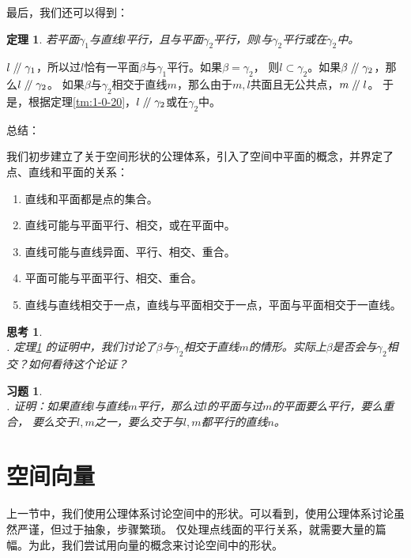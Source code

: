 \documentclass[12pt,UTF8]{ctexbook}
\newtheorem{tm}{定理}[section]
\newtheorem{sk}{思考}[section]
\renewcommand\parallel{\mathrel{/\mskip-4mu/}}
\newtheorem{xt}{习题}[section]
\begin{document}
最后，我们还可以得到：
\begin{tm}\label{tm:1-0-100}
    若平面$\gamma_1$与直线$l$平行，且与平面$\gamma_2$平行，则$l$与$\gamma_2$平行或在$\gamma_2$中。
\end{tm}
\begin{proof2}
    $l\parallel \gamma_1$，所以过$l$恰有一平面$\beta$与$\gamma_1$平行。如果$\beta=\gamma_2$，
    则$l\subset\gamma_2$。如果$\beta\parallel\gamma_2$，那么$l\parallel \gamma_2$。
    如果$\beta$与$\gamma_2$相交于直线$m$，那么由于$m,l$共面且无公共点，$m\parallel l$。
    于是，根据定理\ref{tm:1-0-20}，$l\parallel \gamma_2$或在$\gamma_2$中。
\end{proof2}

总结：

我们初步建立了关于空间形状的公理体系，引入了空间中平面的概念，并界定了点、直线和平面的关系：
\begin{enumerate}
    \item 直线和平面都是点的集合。
    \item 直线可能与平面平行、相交，或在平面中。
    \item 直线可能与直线异面、平行、相交、重合。
    \item 平面可能与平面平行、相交、重合。
    \item 直线与直线相交于一点，直线与平面相交于一点，平面与平面相交于一直线。
\end{enumerate}


\begin{sk}
    \mbox{} \\
    . 定理\ref{tm:1-0-100} 的证明中，我们讨论了$\beta$与$\gamma_2$相交于直线$m$的情形。实际上$\beta$是否会与$\gamma_2$相交？如何看待这个论证？
\end{sk}

\begin{xt}
    \mbox{} \\
    . 证明：如果直线$l$与直线$m$平行，那么过$l$的平面与过$m$的平面要么平行，要么重合，
    要么交于$l,m$之一，要么交于与$l,m$都平行的直线$n$。 
\end{xt}


\section{空间向量}

上一节中，我们使用公理体系讨论空间中的形状。可以看到，使用公理体系讨论虽然严谨，但过于抽象，步骤繁琐。
仅处理点线面的平行关系，就需要大量的篇幅。为此，我们尝试用向量的概念来讨论空间中的形状。
\end{document}
